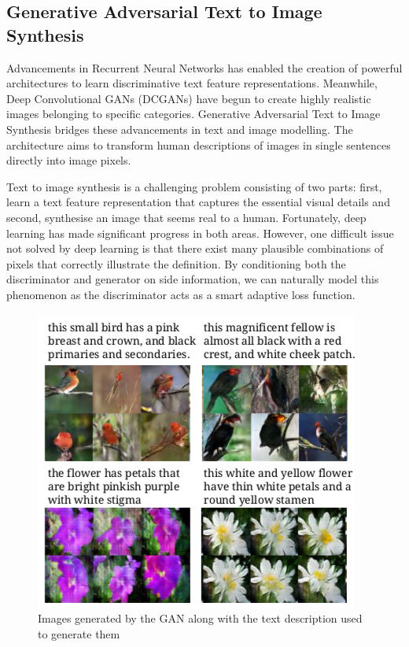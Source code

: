 \begin{onehalfspace}
    \section{Generative Adversarial Text to Image Synthesis}
    Advancements in Recurrent Neural Networks has enabled the creation of 
    powerful architectures to learn discriminative text feature representations. 
    Meanwhile, Deep Convolutional GANs (DCGANs) have begun to create highly 
    realistic images belonging to specific categories. Generative Adversarial 
    Text to Image Synthesis \cite{texttoimagegan} bridges these advancements in 
    text and image modelling. 
    The architecture aims to transform human descriptions of images in single 
    sentences directly into image pixels.

    Text to image synthesis is a challenging problem consisting of two parts: 
    first, learn a text feature representation that captures the essential 
    visual details and second, synthesise an image that seems real to a human. 
    Fortunately, deep learning has made significant progress in both areas. 
    However, one difficult issue not solved by deep learning is that there 
    exist many plausible combinations of pixels that correctly illustrate the 
    definition. By conditioning both the discriminator and generator on side 
    information, we can naturally model this phenomenon as the discriminator 
    acts as a smart adaptive loss function.

    \begin{figure}[h]
        \caption{Images generated by the GAN along with the text description 
        used to generate them \cite{texttoimagegan}}
        \centering
        \includegraphics[width=0.6\linewidth]{images/texttoimage.png}
    \end{figure} 


\end{onehalfspace}
